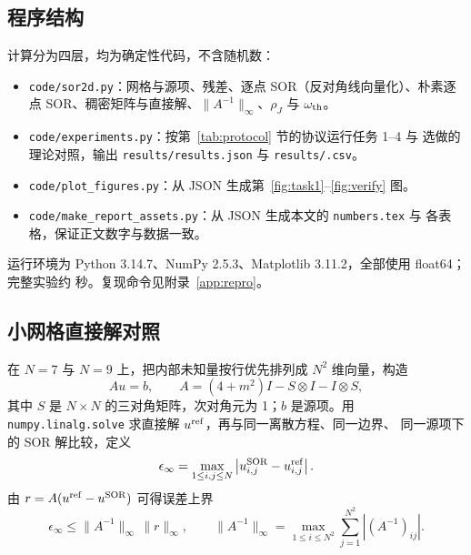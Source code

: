 \documentclass[UTF8,fontset=windows,a4paper,11pt]{ctexart}
\newcommand{\SOR}{\mathrm{SOR}}
\begin{document}
\subsection{程序结构}

计算分为四层，均为确定性代码，不含随机数：
\begin{itemize}[leftmargin=2.1em,itemsep=0.15em,topsep=0.2em]
\item \texttt{code/sor2d.py}：网格与源项、残差、逐点 SOR（反对角线向量化）、朴素逐点
SOR、稠密矩阵与直接解、$\|A^{-1}\|_\infty$、$\rho_J$ 与 $\omega_{\rm th}$。
\item \texttt{code/experiments.py}：按第~\ref{tab:protocol} 节的协议运行任务 1--4 与
选做的理论对照，输出 \texttt{results/\allowbreak results.json} 与 \texttt{results/\allowbreak *.csv}。
\item \texttt{code/\allowbreak plot\_figures.py}：从 JSON 生成第~\ref{fig:task1}--\ref{fig:verify} 图。
\item \texttt{code/\allowbreak make\_report\_assets.py}：从 JSON 生成本文的 \texttt{numbers.tex} 与
各表格，保证正文数字与数据一致。
\end{itemize}
运行环境为 Python 3.14.7、NumPy 2.5.3、Matplotlib 3.11.2，全部使用 float64；
完整实验约 \Elapsed{} 秒。复现命令见附录~\ref{app:repro}。

\subsection{小网格直接解对照}

在 $N=7$ 与 $N=9$ 上，把内部未知量按行优先排列成 $N^2$ 维向量，构造
\begin{equation}
Au=b,\qquad
A=(4+m^2)I-S\otimes I-I\otimes S,
\label{eq:dense}
\end{equation}
其中 $S$ 是 $N\times N$ 的三对角矩阵，次对角元为 1；$b$ 是源项。用
\texttt{numpy.linalg.solve} 求直接解 $u^{\rm ref}$，再与同一离散方程、同一边界、
同一源项下的 SOR 解比较，定义
\begin{equation}
\epsilon_\infty=\max_{1\le i,j\le N}\left|u_{i,j}^{\SOR}-u_{i,j}^{\rm ref}\right|.
\label{eq:eps}
\end{equation}
由 $r=A(u^{\rm ref}-u^{\SOR})$ 可得误差上界
\begin{equation}
\epsilon_\infty\le\|A^{-1}\|_\infty\,\|r\|_\infty,
\qquad
\|A^{-1}\|_\infty=\max_{1\le i\le N^2}\sum_{j=1}^{N^2}|(A^{-1})_{ij}| .
\label{eq:bound}
\end{equation}

\begin{table}[htbp]
\centering
\caption{$N=7,9$、$m=0.5$、$\omega=1.5$ 时的直接解对照。$\epsilon_\infty$ 为 SOR 解与
直接解的最大差，最后一列为 $u-u^{\mathsf T}$ 的最大绝对非对称性。}
\label{tab:verify}
\footnotesize
\setlength{\tabcolsep}{4.2pt}

\end{table}
\end{document}
